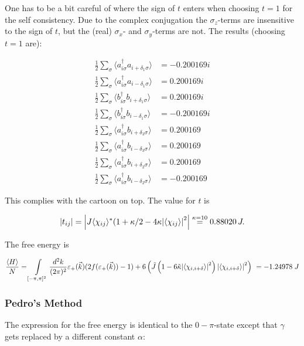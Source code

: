 \documentclass[../../../main.tex]{subfiles}
\begin{document}
One has to be a bit careful of where the sign of $t$ enters when choosing $t=1$ for the self consistency. Due to the complex conjugation the $\sigma_z$-terms are insensitive to the sign of $t$, but the (real) $\sigma_x$- and $\sigma_y$-terms are not. The results (choosing $t=1$ are):

\begin{align}
	\frac12	\sum_\sigma\langle a_{i\sigma}^\dagger a_{i+\delta_1\sigma } \rangle &= -0.200169i\\
	\frac12	\sum_\sigma\langle a_{i\sigma}^\dagger a_{i-\delta_1\sigma } \rangle &= 0.200169i\\
	\frac12 \sum_\sigma \langle b_{i\sigma}^\dagger b_{i+\delta_1\sigma} \rangle &= 0.200169i\\
	\frac12 \sum_\sigma \langle b_{i\sigma}^\dagger b_{i-\delta_1\sigma} \rangle &= -0.200169i\\
	\frac12 \sum_\sigma \langle a_{i\sigma}^\dagger b_{i+\delta_3\sigma} \rangle &= 0.200169\\
	\frac12 \sum_\sigma \langle a_{i\sigma}^\dagger b_{i-\delta_3\sigma} \rangle &= 0.200169\\
	\frac12 \sum_\sigma \langle a_{i\sigma}^\dagger b_{i+\delta_2\sigma} \rangle &= 0.200169 \\
	\frac12 \sum_\sigma \langle a_{i\sigma}^\dagger b_{i-\delta_2\sigma} \rangle &= -0.200169
\end{align}

This complies with the cartoon on top. The value for $t$ is 

\begin{equation}
	|t_{ij}| = \left| J \langle \chi_{ij}\rangle^*(1+\kappa/2 - 4\kappa\abs{\langle \chi_{ij} \rangle}^2\right| \overset{\kappa = 10}{=} 0.88020 \, J. 
\end{equation}

The free energy is 

\begin{equation}
	\frac{\langle H \rangle}{N} = \int\limits_{[-\pi,\pi]^2}\frac{d^2k}{(2\pi)^2} \varepsilon_+(\vec{k}) (2f(\varepsilon_+(\vec{k}))-1) + 6\left( \tilde{J}\left(1-6\tilde{\kappa}\abs{\langle\chi_{i,i+\delta}\rangle}^2\right)\abs{\langle\chi_{i,i+\delta}\rangle}^2\right)
\ = -1.24978 \; J 
\end{equation}

\subsubsection{Pedro's Method}
The expression for the free energy is identical to the $0-\pi$-state except that $\gamma$ gets replaced by a different constant $\alpha$:
\end{document}
